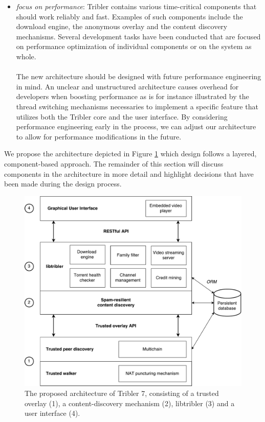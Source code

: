 \begin{itemize}
	\item \emph{focus on performance}: Tribler contains various time-critical components that should work reliably and fast. Examples of such components include the download engine, the anonymous overlay and the content discovery mechanisms. Several development tasks have been conducted that are focused on performance optimization of individual components or on the system as whole.\\\\
	The new architecture should be designed with future performance engineering in mind. An unclear and unstructured architecture causes overhead for developers when boosting performance as is for instance illustrated by the thread switching mechanisms necessaries to implement a specific feature that utilizes both the Tribler core and the user interface. By considering performance engineering early in the process, we can adjust our architecture to allow for performance modifications in the future.
\end{itemize}
We propose the architecture depicted in Figure \ref{fig:tribler7} which design follows a layered, component-based approach. The remainder of this section will discuss components in the architecture in more detail and highlight decisions that have been made during the design process.

\begin{figure}[h!]
	\centering
	\includegraphics[width=0.9\columnwidth]{images/architecture/tribler7}
	\caption{The proposed architecture of Tribler 7, consisting of a trusted overlay (1), a content-discovery mechanism (2), libtribler (3) and a user interface (4).}
	\label{fig:tribler7}
\end{figure}

